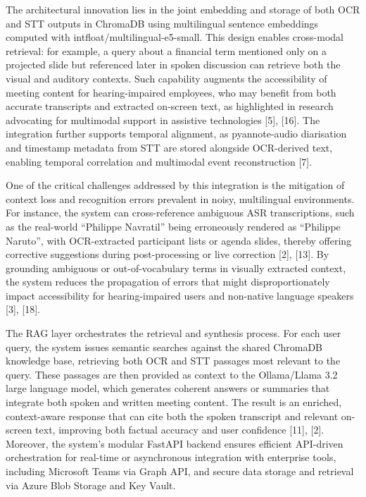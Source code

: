 \documentclass[12pt,a4paper]{article}
\begin{document}
The architectural innovation lies in the joint embedding and storage of both OCR and STT outputs in ChromaDB using multilingual sentence embeddings computed with intfloat/multilingual-e5-small. This design enables cross-modal retrieval: for example, a query about a financial term mentioned only on a projected slide but referenced later in spoken discussion can retrieve both the visual and auditory contexts. Such capability augments the accessibility of meeting content for hearing-impaired employees, who may benefit from both accurate transcripts and extracted on-screen text, as highlighted in research advocating for multimodal support in assistive technologies [5], [16]. The integration further supports temporal alignment, as pyannote-audio diarisation and timestamp metadata from STT are stored alongside OCR-derived text, enabling temporal correlation and multimodal event reconstruction [7].


One of the critical challenges addressed by this integration is the mitigation of context loss and recognition errors prevalent in noisy, multilingual environments. For instance, the system can cross-reference ambiguous ASR transcriptions, such as the real-world “Philippe Navratil” being erroneously rendered as “Philippe Naruto”, with OCR-extracted participant lists or agenda slides, thereby offering corrective suggestions during post-processing or live correction [2], [13]. By grounding ambiguous or out-of-vocabulary terms in visually extracted context, the system reduces the propagation of errors that might disproportionately impact accessibility for hearing-impaired users and non-native language speakers [3], [18].


The RAG layer orchestrates the retrieval and synthesis process. For each user query, the system issues semantic searches against the shared ChromaDB knowledge base, retrieving both OCR and STT passages most relevant to the query. These passages are then provided as context to the Ollama/Llama 3.2 large language model, which generates coherent answers or summaries that integrate both spoken and written meeting content. The result is an enriched, context-aware response that can cite both the spoken transcript and relevant on-screen text, improving both factual accuracy and user confidence [11], [2]. Moreover, the system’s modular FastAPI backend ensures efficient API-driven orchestration for real-time or asynchronous integration with enterprise tools, including Microsoft Teams via Graph API, and secure data storage and retrieval via Azure Blob Storage and Key Vault.
\end{document}
